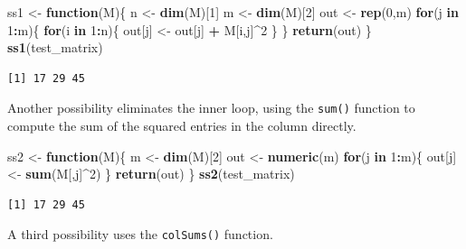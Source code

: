 \documentclass[
]{krantz}
\makeatletter
\newenvironment{Shaded}{\begin{snugshade}}{\end{snugshade}}
\newcommand{\ControlFlowTok}[1]{\textcolor[rgb]{0.27,0.27,0.27}{\textbf{#1}}}
\newcommand{\DecValTok}[1]{\textcolor[rgb]{0.06,0.06,0.06}{#1}}
\newcommand{\KeywordTok}[1]{\textcolor[rgb]{0.27,0.27,0.27}{\textbf{#1}}}
\newcommand{\NormalTok}[1]{#1}
\newcommand{\OperatorTok}[1]{\textcolor[rgb]{0.43,0.43,0.43}{\textbf{#1}}}
\newcommand{\StringTok}[1]{\textcolor[rgb]{0.5,0.5,0.5}{#1}}
\newenvironment{kframe}{%
\medskip{}
\setlength{\fboxsep}{.8em}
 \def\at@end@of@kframe{}%
 \ifinner\ifhmode%
  \def\at@end@of@kframe{\end{minipage}}%
  \begin{minipage}{\columnwidth}%
 \fi\fi%
 \def\FrameCommand##1{\hskip\@totalleftmargin \hskip-\fboxsep
 \colorbox{shadecolor}{##1}\hskip-\fboxsep
     \hskip-\linewidth \hskip-\@totalleftmargin \hskip\columnwidth}%
 \MakeFramed {\advance\hsize-\width
   \@totalleftmargin\z@ \linewidth\hsize
   \@setminipage}}%
 {\par\unskip\endMakeFramed%
 \at@end@of@kframe}
\renewenvironment{Shaded}{\begin{kframe}}{\end{kframe}}
\makeatother
\begin{document}
\begin{Shaded}
\begin{Highlighting}[]
\NormalTok{ss1 \textless{}{-}}\StringTok{ }\ControlFlowTok{function}\NormalTok{(M)\{}
\NormalTok{    n \textless{}{-}}\StringTok{ }\KeywordTok{dim}\NormalTok{(M)[}\DecValTok{1}\NormalTok{]}
\NormalTok{    m \textless{}{-}}\StringTok{ }\KeywordTok{dim}\NormalTok{(M)[}\DecValTok{2}\NormalTok{]}
\NormalTok{    out \textless{}{-}}\StringTok{ }\KeywordTok{rep}\NormalTok{(}\DecValTok{0}\NormalTok{,m)}
    \ControlFlowTok{for}\NormalTok{(j }\ControlFlowTok{in} \DecValTok{1}\OperatorTok{:}\NormalTok{m)\{}
        \ControlFlowTok{for}\NormalTok{(i }\ControlFlowTok{in} \DecValTok{1}\OperatorTok{:}\NormalTok{n)\{}
\NormalTok{            out[j] \textless{}{-}}\StringTok{ }\NormalTok{out[j] }\OperatorTok{+}\StringTok{ }\NormalTok{M[i,j]}\OperatorTok{\^{}}\DecValTok{2}
\NormalTok{        \} }
\NormalTok{    \}}
    \KeywordTok{return}\NormalTok{(out)}
\NormalTok{\}}
\KeywordTok{ss1}\NormalTok{(test\_matrix)}
\end{Highlighting}
\end{Shaded}

\begin{verbatim}
[1] 17 29 45
\end{verbatim}

Another possibility eliminates the inner loop, using the \texttt{sum()} function to compute the sum of the squared entries in the column directly.

\begin{Shaded}
\begin{Highlighting}[]
\NormalTok{ss2 \textless{}{-}}\StringTok{ }\ControlFlowTok{function}\NormalTok{(M)\{}
\NormalTok{    m \textless{}{-}}\StringTok{ }\KeywordTok{dim}\NormalTok{(M)[}\DecValTok{2}\NormalTok{]}
\NormalTok{    out \textless{}{-}}\StringTok{ }\KeywordTok{numeric}\NormalTok{(m)}
    \ControlFlowTok{for}\NormalTok{(j }\ControlFlowTok{in} \DecValTok{1}\OperatorTok{:}\NormalTok{m)\{}
\NormalTok{        out[j] \textless{}{-}}\StringTok{ }\KeywordTok{sum}\NormalTok{(M[,j]}\OperatorTok{\^{}}\DecValTok{2}\NormalTok{)}
\NormalTok{    \}}
    \KeywordTok{return}\NormalTok{(out) }
\NormalTok{\}}
\KeywordTok{ss2}\NormalTok{(test\_matrix)}
\end{Highlighting}
\end{Shaded}

\begin{verbatim}
[1] 17 29 45
\end{verbatim}

A third possibility uses the \texttt{colSums()} function.
\end{document}

